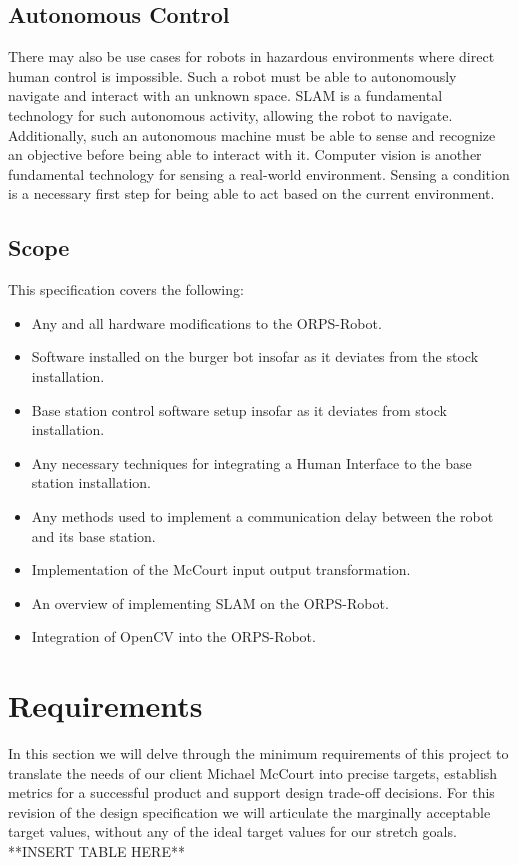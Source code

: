 \documentclass[english,12pt]{article}
\begin{document}
\subsection{Autonomous Control}
There may also be use cases for robots in hazardous environments where direct human control is
impossible. Such a robot must be able to autonomously navigate and interact with an unknown space.
SLAM is a fundamental technology for such autonomous activity, allowing the robot to navigate.
Additionally, such an autonomous machine must be able to sense and recognize an objective before
being able to interact with it. Computer vision is another
fundamental technology for sensing a real-world environment.
Sensing a condition is a necessary first step for being able to act
based on the current environment.
\subsection{Scope}
This specification covers the following:\\
\begin{itemize}
    \item Any and all hardware modifications to the ORPS-Robot.
    \item Software installed on the burger bot insofar as it deviates
    from the stock installation.
    \item Base station control software setup insofar as it deviates
    from stock installation.
    \item Any necessary techniques for integrating a Human
    Interface to the base station installation.
    \item Any methods used to implement a communication delay
    between the robot and its base station.
    \item Implementation of the McCourt input output transformation.
    \item An overview of implementing SLAM on the ORPS-Robot.
    \item Integration of OpenCV into the ORPS-Robot.
\end{itemize}
\section{Requirements}
In this section we will delve through the minimum requirements of this project to translate the needs of
our client Michael McCourt into precise targets, establish metrics for a successful product and support
design trade-off decisions. For this revision of the design specification we will articulate the marginally
acceptable target values, without any of the ideal target values for our stretch goals.
**INSERT TABLE HERE**
\end{document}
